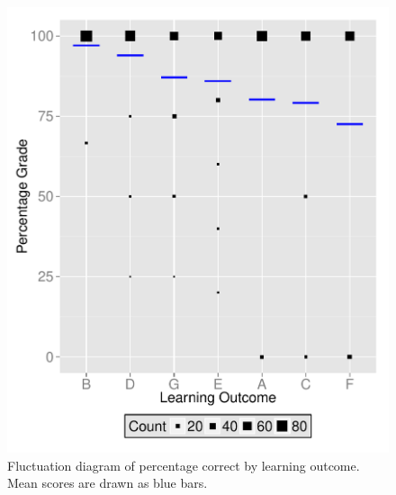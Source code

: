 \documentclass[12pt,english,nohyper]{tufte-handout}\usepackage[]{graphicx}\usepackage[]{color}
\begin{document}
\vspace{5mm}

\begin{figure}[!ht]
\includegraphics[width=\linewidth]{Topic04_LM_LearningObj_boxplot.pdf}
\caption{Fluctuation diagram of percentage correct by learning outcome. Mean scores are drawn as blue bars.}
\label{fig:LearningObj_summary}
\end{figure}
\end{document}

